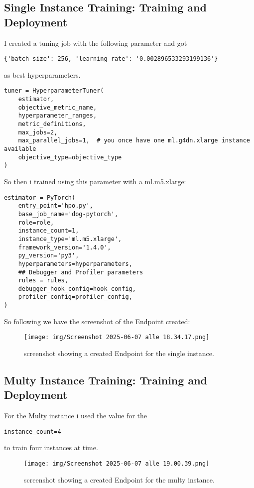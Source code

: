\documentclass[12pt,a4paper]{article}
\begin{document}
\subsection{Single Instance Training: Training and Deployment}
I created a tuning job with the following parameter and got \begin{verbatim}{'batch_size': 256, 'learning_rate': '0.002896533293199136'} \end{verbatim} as best hyperparameters.
\begin{verbatim}
tuner = HyperparameterTuner(
    estimator,
    objective_metric_name,
    hyperparameter_ranges,
    metric_definitions,
    max_jobs=2,
    max_parallel_jobs=1,  # you once have one ml.g4dn.xlarge instance available
    objective_type=objective_type
)
\end{verbatim}
So then i trained using this parameter with a ml.m5.xlarge:
\begin{verbatim}
estimator = PyTorch(
    entry_point='hpo.py',
    base_job_name='dog-pytorch',
    role=role,
    instance_count=1,
    instance_type='ml.m5.xlarge',
    framework_version='1.4.0',
    py_version='py3',
    hyperparameters=hyperparameters,
    ## Debugger and Profiler parameters
    rules = rules,
    debugger_hook_config=hook_config,
    profiler_config=profiler_config,
)
\end{verbatim}

So following we have the screenshot of the Endpoint created:

\begin{figure}[htbp]
  \centering
  \texttt{[image: img/Screenshot 2025-06-07 alle 18.34.17.png]}
  \caption{screenshot showing a created Endpoint for the single instance.}
  \label{fig:example}
\end{figure}

\subsection{Multy Instance Training: Training and Deployment}
For the Multy instance i used the value for the \begin{verbatim}instance_count=4\end{verbatim} to train four instances at time.

\newpage

\begin{figure}[htbp]
  \centering
  \texttt{[image: img/Screenshot 2025-06-07 alle 19.00.39.png]}
  \caption{screenshot showing a created Endpoint for the multy instance.}
  \label{fig:example}
\end{figure}
\end{document}

